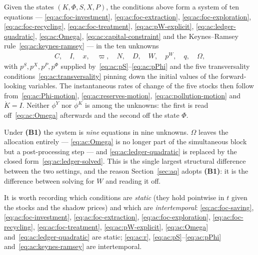  Given the states $\left(K,\Phi,S,X,P\right)$, the conditions above form a system of ten equations --- \eqref{eq:ac:foc-investment}, \eqref{eq:ac:foc-extraction}, \eqref{eq:ac:foc-exploration}, \eqref{eq:ac:foc-recycling}, \eqref{eq:ac:foc-treatment}, \eqref{eq:ac:pW-explicit}, \eqref{eq:ac:ledger-quadratic}, \eqref{eq:ac:Omega}, \eqref{eq:ac:capital-constraint} and the Keynes--Ramsey rule~\eqref{eq:ac:keynes-ramsey} --- in the ten unknowns
\begin{align*}
C,\quad I,\quad x,\quad \varpi,\quad N,\quad D,\quad W,\quad p^W,\quad q,\quad \Omega,
\end{align*}
with $p^S,p^X,p^P,p^\Phi$ supplied by~\eqref{eq:ac:pS}--\eqref{eq:ac:pPhi} and the five transversality conditions~\eqref{eq:ac:transversality} pinning down the initial values of the forward-looking variables. The instantaneous rates of change of the five stocks then follow from~\eqref{eq:ac:Phi-motion}, \eqref{eq:ac:reserves-motion}, \eqref{eq:ac:pollution-motion} and $\dot K=I$. Neither $\phi^Y$ nor $\phi^K$ is among the unknowns: the first is read off~\eqref{eq:ac:Omega} afterwards and the second off the state $\Phi$.

Under \textbf{(B1)} the system is \emph{nine} equations in nine unknowns. $\Omega$ leaves the allocation entirely --- \eqref{eq:ac:Omega} is no longer part of the simultaneous block but a post-processing step --- and \eqref{eq:ac:ledger-quadratic} is replaced by the closed form~\eqref{eq:ac:ledger-solved}. This is the single largest structural difference between the two settings, and the reason Section~\ref{sec:aq} adopts \textbf{(B1)}: it is the difference between solving for $W$ and reading it off.

It is worth recording which conditions are \emph{static} (they hold pointwise in $t$ given the stocks and the shadow prices) and which are \emph{intertemporal}: \eqref{eq:ac:foc-saving}, \eqref{eq:ac:foc-investment}, \eqref{eq:ac:foc-extraction}, \eqref{eq:ac:foc-exploration}, \eqref{eq:ac:foc-recycling}, \eqref{eq:ac:foc-treatment}, \eqref{eq:ac:pW-explicit}, \eqref{eq:ac:Omega} and~\eqref{eq:ac:ledger-quadratic} are static; \eqref{eq:ac:r}, \eqref{eq:ac:pS}--\eqref{eq:ac:pPhi} and~\eqref{eq:ac:keynes-ramsey} are intertemporal.

